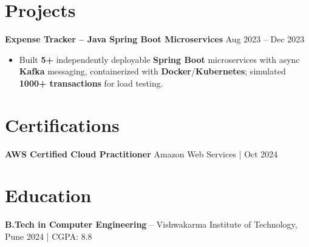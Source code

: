 \documentclass[a4paper,10pt]{article}
\begin{document}
\section*{Projects}

\textbf{Expense Tracker -- Java Spring Boot Microservices} \hfill Aug 2023 -- Dec 2023
\begin{itemize}[leftmargin=*]
    \item Built \textbf{5+} independently deployable \textbf{Spring Boot} microservices with async \textbf{Kafka} messaging, containerized with \textbf{Docker}/\textbf{Kubernetes}; simulated \textbf{1000+ transactions} for load testing.
\end{itemize}

\section*{Certifications}
\textbf{AWS Certified Cloud Practitioner} \hfill Amazon Web Services \;|\; Oct 2024

\section*{Education}
\textbf{B.Tech in Computer Engineering} -- Vishwakarma Institute of Technology, Pune \hfill 2024 \;|\; CGPA: 8.8
\end{document}
